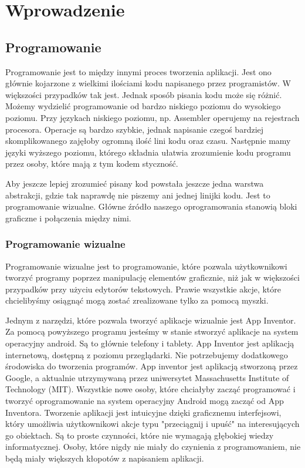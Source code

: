 \chapter{Wprowadzenie}
\label{c1}

\section{Programowanie}
\label{c11}

Programowanie jest to między innymi proces tworzenia aplikacji. Jest ono głównie kojarzone z wielkimi ilościami kodu napisanego przez programistów. W większości przypadków tak jest. Jednak sposób pisania kodu może się różnić. Możemy wydzielić programowanie od bardzo niskiego poziomu do wysokiego poziomu. Przy językach niskiego poziomu, np. Assembler operujemy na rejestrach procesora. Operacje są bardzo szybkie, jednak napisanie czegoś bardziej skomplikowanego zajęłoby ogromną ilość lini kodu oraz czasu. Następnie mamy języki wyższego poziomu, którego składnia ułatwia zrozumienie kodu programu przez osoby, które mają z tym kodem styczność.

Aby jeszcze lepiej zrozumieć pisany kod powstała jeszcze jedna warstwa abstrakcji, gdzie tak naprawdę nie piszemy ani jednej linijki kodu. Jest to programowanie wizualne. Główne źródło naszego oprogramowania stanowią bloki graficzne i połączenia między nimi.


\subsection{Programowanie wizualne}
\label{c111}
Programowanie wizualne jest to programowanie, które pozwala użytkownikowi tworzyć programy poprzez manipulację elementów graficznie, niż jak w większości przypadków przy użyciu edytorów tekstowych. Prawie wszystkie akcje, które chcielibyśmy osiągnąć mogą zostać zrealizowane tylko za pomocą myszki.

Jednym z narzędzi, które pozwala tworzyć aplikacje wizualnie jest App Inventor. Za pomocą powyższego programu jesteśmy w stanie stworzyć aplikacje na system operacyjny android. Są to głównie telefony i tablety. App Inventor jest aplikacją internetową, dostępną z poziomu przeglądarki. Nie potrzebujemy dodatkowego środowiska do tworzenia programów. App inventor jest aplikacją stworzoną przez Google, a aktualnie utrzymywaną przez uniwersytet Massachusetts Institute of Technology (MIT). Wszystkie nowe osoby, które chciałyby zacząć programować i tworzyć oprogramowanie na system operacyjny Android mogą zacząć od App Inventora. Tworzenie aplikacji jest intuicyjne dzięki graficznemu interfejsowi, który umożliwia użytkownikowi akcje typu "przeciągnij i upuść" na interesujących go obiektach.\cite{wiki:appinventor} Są to proste czynności, które nie wymagają głębokiej wiedzy informatycznej. Osoby, które nigdy nie miały do czynienia z programowaniem, nie będą miały większych kłopotów z napisaniem aplikacji.

